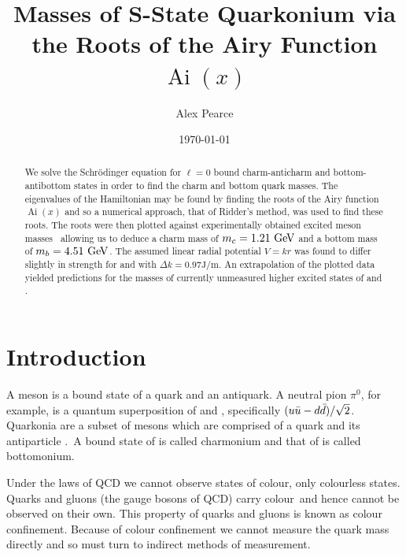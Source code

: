 \documentclass[]{article}
\newcommand{\Ai}[1]{\ensuremath{\operatorname{Ai}({#1})}}
\begin{document}
\title{Masses of S-State Quarkonium via the Roots of the Airy Function $\Ai{x}$}
\author{Alex Pearce}
\date{\today}
\maketitle


\begin{abstract}
We solve the Schr\"{o}dinger equation for $\ell = 0$ bound charm-anticharm \ccbar and bottom-antibottom \bbbar states in order to find the charm and bottom quark masses. The eigenvalues of the Hamiltonian may be found by finding the roots of the Airy function $\Ai{x}$ and so a numerical approach, that of Ridder's method, was used to find these roots. The roots were then plotted against experimentally obtained excited meson masses~\cite{ref:gdaniell} allowing us to deduce a charm mass of $m_{c} = 1.21\GeV$ and a bottom mass of $m_{b} = 4.51\GeV$. The assumed linear radial potential $V = kr$ was found to differ slightly in strength for \ccbar and \bbbar with $\Delta k = 0.97\si{\joule\per\metre}$. An extrapolation of the plotted data yielded predictions for the masses of currently unmeasured higher excited states of \ccbar and \bbbar.
\end{abstract}


\section{Introduction}\label{sec:intro}

A meson is a bound state of a quark and an antiquark. A neutral pion $\pi^{0}$, for example, is a quantum superposition of \uubar and \ddbar, specifically $(u\bar{u} - d\bar{d})/\sqrt{2}$. Quarkonia are a subset of mesons which are comprised of a quark and its antiparticle \qqbar.\footnotemark\ A bound state of \ccbar is called charmonium and that of \bbbar is called bottomonium.


Under the laws of QCD we cannot observe states of colour, only colourless states. Quarks and gluons (the gauge bosons of QCD) carry colour\footnotemark\ and hence cannot be observed on their own. This property of quarks and gluons is known as colour confinement. Because of colour confinement we cannot measure the quark mass directly and so must turn to indirect methods of measurement.
\end{document}

